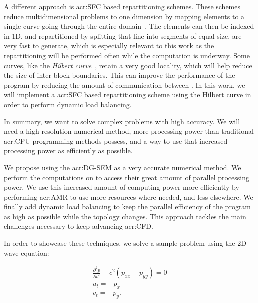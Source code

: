 A different approach is \acrfull{acr:SFC} based repartitioning schemes. These schemes reduce
multidimensional problems to one dimension by mapping elements to a single curve going through the
entire domain~\cite{Peano1890}. The elements can then be indexed in 1D, and repartitioned by
splitting that line into segments of equal size.  are very fast to generate,
which is especially relevant to this work as the repartitioning will be performed often while the
computation is underway. Some curves, like the \textit{Hilbert curve}~\cite{Hilbert1891}, retain a
very good locality, which will help reduce the size of inter-block boundaries. This can improve the
performance of the program by reducing the amount of communication between . In
this work, we will implement a \acrshort{acr:SFC} based repartitioning scheme using the Hilbert
curve in order to perform dynamic load balancing.

In summary, we want to solve complex problems with high accuracy. We will need a high resolution
numerical method, more processing power than traditional \acrshort{acr:CPU} programming methods
possess, and a way to use that increased processing power as efficiently as possible. 

We propose using the \acrlong{acr:DG-SEM} as a very accurate numerical method. We perform the
computations on  to access their great amount of parallel processing power. We
use this increased amount of computing power more efficiently by performing \acrlong{acr:AMR} to use
more resources where needed, and less elsewhere. We finally add dynamic load balancing to keep the
parallel efficiency of the program as high as possible while the topology changes. This approach
tackles the main challenges necessary to keep advancing \acrshort{acr:CFD}.

In order to showcase these techniques, we solve a sample problem using the 2D wave equation:

\begin{gather}
	\frac{\partial^2p}{\partial t^2} - c^2(p_{xx} + p_{yy}) = 0 \\
	u_t = - p_x \\
	v_t = -p_y.
\end{gather}

